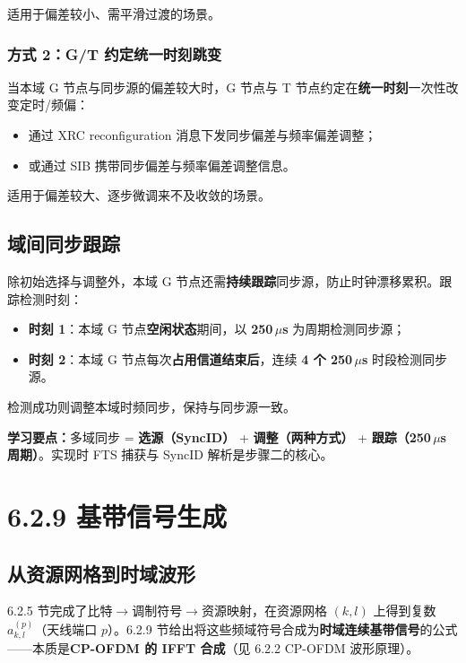 \documentclass[11pt,a4paper]{ctexart}
\newcommand{\learn}[1]{\par\noindent\textcolor{blue!70!black}{\textbf{学习要点：}#1}\par}
\begin{document}
适用于偏差较小、需平滑过渡的场景。

\subsubsection{方式 2：G/T 约定统一时刻跳变}

当本域 G 节点与同步源的偏差较大时，G 节点与 T 节点约定在\textbf{统一时刻}一次性改变定时/频偏：
\begin{itemize}
  \item 通过 XRC reconfiguration 消息下发同步偏差与频率偏差调整；
  \item 或通过 SIB 携带同步偏差与频率偏差调整信息。
\end{itemize}

适用于偏差较大、逐步微调来不及收敛的场景。

\subsection{域间同步跟踪}

除初始选择与调整外，本域 G 节点还需\textbf{持续跟踪}同步源，防止时钟漂移累积。跟踪检测时刻：

\begin{itemize}
  \item \textbf{时刻 1}：本域 G 节点\textbf{空闲状态}期间，以 \textbf{250\,$\mu$s} 为周期检测同步源；
  \item \textbf{时刻 2}：本域 G 节点每次\textbf{占用信道结束后}，连续 \textbf{4 个 250\,$\mu$s} 时段检测同步源。
\end{itemize}

检测成功则调整本域时频同步，保持与同步源一致。

\learn{多域同步 = \textbf{选源（SyncID）} + \textbf{调整（两种方式）} + \textbf{跟踪（250\,$\mu$s 周期）}。实现时 FTS 捕获与 SyncID 解析是步骤二的核心。}

\newpage
\section{6.2.9 基带信号生成}

\subsection{从资源网格到时域波形}

6.2.5 节完成了比特$\rightarrow$调制符号$\rightarrow$资源映射，在资源网格 $(k,l)$ 上得到复数 $a_{k,l}^{(p)}$（天线端口 $p$）。6.2.9 节给出将这些频域符号合成为\textbf{时域连续基带信号}的公式——本质是\textbf{CP-OFDM 的 IFFT 合成}（见 6.2.2 CP-OFDM 波形原理）。
\end{document}
